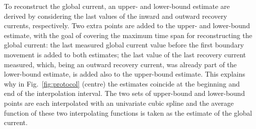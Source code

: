 To reconstruct the global current, an upper- and lower-bound estimate are derived by considering the last values of the inward and outward recovery currents, respectively. Two extra points are added to the upper- and lower-bound estimate, with the goal of covering the maximum time span for reconstructing the global current: the last measured global current value before the first boundary movement is added to both estimates; the last value of the last recovery current measured, which, being an outward recovery current, was already part of the lower-bound estimate, is added also to the upper-bound estimate. This explains why in Fig.~\ref{fig:protocol} (centre) the estimates coincide at the beginning and end of the interpolation interval. The two sets of upper-bound and lower-bound points are each interpolated with an univariate cubic spline and the average function of these two interpolating functions is taken as the estimate of the global current. 

